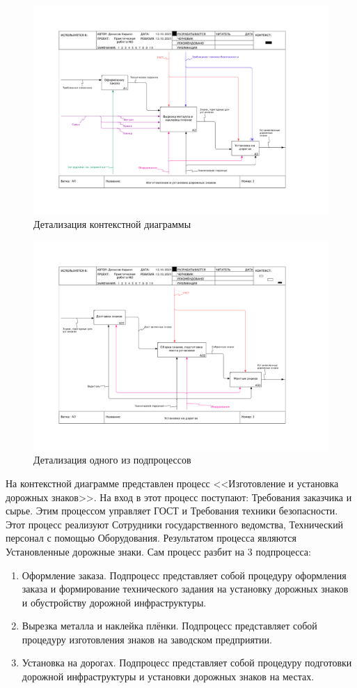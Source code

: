 \documentclass[a4paper,14pt]{extarticle}
\begin{document}
\begin{figure}%
	\centering
	\includegraphics[width=0.9\linewidth]{images/ramusPr5-2}
	\caption{Детализация контекстной диаграммы}
	\label{fig:ramuspr5-2}
\end{figure}

\begin{figure}%
	\centering
	\includegraphics[width=0.9\linewidth]{images/ramusPr5-3}
	\caption{Детализация одного из подпроцессов}
	\label{fig:ramuspr5-3}
\end{figure}
	
На контекстной диаграмме представлен процесс <<Изготовление и установка дорожных знаков>>. На вход в этот процесс поступают: Требования заказчика и сырье. Этим процессом управляет ГОСТ и Требования техники безопасности. Этот процесс реализуют Сотрудники государственного ведомства, Технический персонал с помощью Оборудования. Результатом процесса являются Установленные дорожные знаки.
Сам процесс разбит на 3 подпроцесса:
\begin{enumerate}
	\item Оформление заказа. Подпроцесс представляет собой процедуру оформления заказа и формирование технического задания на установку дорожных знаков и обустройству дорожной инфраструктуры.
	\item Вырезка металла и наклейка плёнки. Подпроцесс представляет собой процедуру изготовления знаков на заводском предприятии.
	\item  Установка на дорогах. Подпроцесс представляет собой процедуру подготовки дорожной инфраструктуры и установки дорожных знаков на местах.   
\end{enumerate}
\end{document}
